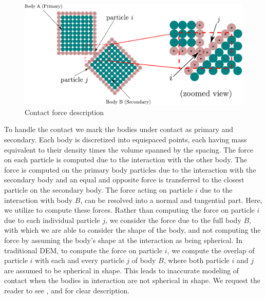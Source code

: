 \begin{figure}[!htpb]
  \centering
  \includegraphics[width=1.0\textwidth]{images/rfc/images/contact_force/contact_force_description}
  \caption{Contact force description}
\label{fig:contact_foce_description}
\end{figure}
To handle the contact we mark the bodies under contact as primary and secondary.
Each body is discretized into equispaced points, each having mass equivalent to
their density times the volume spanned by the spacing. The force on each
particle is computed due to the interaction with the other body. The force is
computed on the primary body particles due to the interaction with the secondary
body and an equal and opposite force is transferred to the closest particle on
the secondary body. The force acting on particle $i$ due to the interaction with
body $B$, can be resolved into a normal and tangential part. Here, we utilize
\cite{mohseni2021particle} to compute these forces. Rather than computing the
force on particle $i$ due to each individual particle $j$, we consider the force
due to the full body $B$, with which we are able to consider the shape of the
body, and not computing the force by assuming the body's shape at the
interaction as being spherical. In traditional DEM, to compute the force on
particle $i$, we compute the overlap of particle $i$ with each and every
particle $j$ of body $B$, where both particle $i$ and $j$ are assumed to be
spherical in shape. This leads to inaccurate modeling of contact when the bodies
in interaction are not spherical in shape. We request the reader to see
\cite{mohseni2021particle}, and \citep{adepu_improved_2022} for clear
description.

